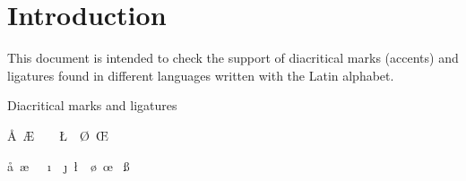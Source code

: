 \documentclass{article}
\newcommand{\DiacriticsLC}{}
\newcommand{\DiacriticsUC}{}
\newcommand\OtherGlyphsLC{\aa\ \ae\ \dh\ \dj\ \i\ \ij\ \j\ \l\ \ng\ \o\ \oe\ %
\ss\ \th\ }%
\newcommand\OtherGlyphsUC{\AA\ \AE\ \DH\ \DJ\ \IJ\ \L\ \NG\ \O\ \OE\ %
\SS\ \TH\ }%
\begin{document}
\section*{Introduction}

This document is intended to check the support of diacritical marks (accents) 
and ligatures found in different languages written with the Latin alphabet.

\begin{quiz}[points=1]{Diacritical marks and ligatures}
\begin{multi}{\OtherGlyphsUC}
\DiacriticsUC
\item* \DiacriticsLC
\item \OtherGlyphsLC
\end{multi}
\end{quiz}
\end{document}
